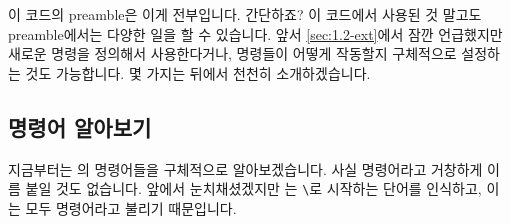 이 코드의 preamble은 이게 전부입니다. 간단하죠?
이 코드에서 사용된 것 말고도  preamble에서는 다양한 일을 할 수 있습니다.
앞서 \ref{sec:1.2-ext}에서 잠깐 언급했지만 새로운 명령을 정의해서 사용한다거나, 명령들이 어떻게 작동할지 구체적으로 설정하는 것도 가능합니다.
몇 가지는 뒤에서 천천히 소개하겠습니다.


\subsection{명령어 알아보기}
\label{sec:3-cmd}
지금부터는 \lt 의 명령어들을 구체적으로 알아보겠습니다.
사실 명령어라고 거창하게 이름 붙일 것도 없습니다.
앞에서 눈치채셨겠지만 \lt 는 \verb|\|로 시작하는 단어를 인식하고, 이는 모두 명령어라고 불리기 때문입니다.

